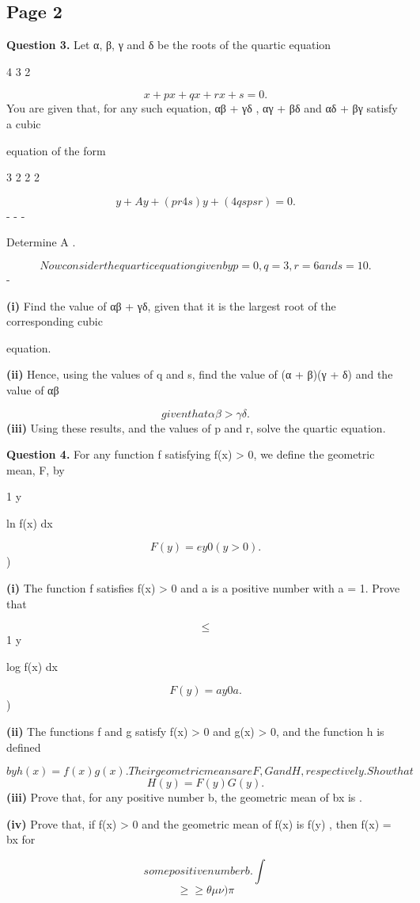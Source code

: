 \documentclass[12pt]{article}
\begin{document}
\subsection*{Page 2}
\begin{flushleft}
\bigskip\textbf{Question 3.} Let α, β, γ and δ be the roots of the quartic equation\par
4 3 2\par
\[x + px + qx + rx + s = 0 .\]
You are given that, for any such equation, αβ + γδ , αγ + βδ and αδ + βγ satisfy a cubic\par
equation of the form\par
3 2 2 2\par
\[y + Ay + (pr 4s)y + (4qs p s r ) = 0 .\]
- - -\par
Determine A .\par
\[Now consider the quartic equation given by p = 0 , q = 3 , r = 6 and s = 10 .\]
-\par
\textbf{(i)} Find the value of αβ + γδ, given that it is the largest root of the corresponding cubic\par
equation.\par
\textbf{(ii)} Hence, using the values of q and s, find the value of (α + β)(γ + δ) and the value of αβ\par
\[given that αβ > γδ .\]
\textbf{(iii)} Using these results, and the values of p and r, solve the quartic equation.\par
\bigskip\textbf{Question 4.} For any function f satisfying f(x) > 0, we define the geometric mean, F, by\par
1 y\par
ln f(x) dx\par
\[F(y) = e y 0 (y > 0) .\]
)\par
\textbf{(i)} The function f satisfies f(x) > 0 and a is a positive number with a = 1. Prove that\par
\[\leq\]
1 y\par
log f(x) dx\par
\[F(y) = a y 0 a .\]
)\par
\textbf{(ii)} The functions f and g satisfy f(x) > 0 and g(x) > 0, and the function h is defined\par
\[by h(x) = f(x)g(x). Their geometric means are F, G and H, respectively. Show that\]
\[H(y) = F(y)G(y) .\]
\textbf{(iii)} Prove that, for any positive number b, the geometric mean of bx is \sqrtby .\par
\textbf{(iv)} Prove that, if f(x) > 0 and the geometric mean of f(x) is f(y) , then f(x) = bx for\par
\[some positive number b. \int\]
\[\geq\geq\theta\mu\nu) \pi\]
\end{flushleft}
\end{document}
